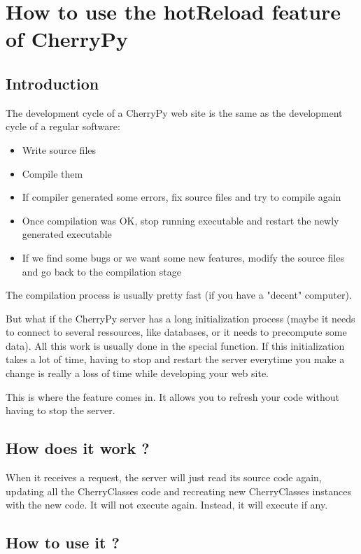 \documentclass{manual}
\begin{document}
\chapter{How to use the hotReload feature of CherryPy}
\section{Introduction}
The development cycle of a CherryPy web site is the same as the development cycle of a regular software:
\begin{itemize}
\item
Write source files
\item
Compile them
\item
If compiler generated some errors, fix source files and try to compile again
\item
Once compilation was OK, stop running executable and restart the newly generated executable
\item
If we find some bugs or we want some new features, modify the source files and go back to the compilation stage
\end{itemize}

The compilation process is usually pretty fast (if you have a "decent" computer).

But what if the CherryPy server has a long initialization process (maybe it needs to connect to several ressources,
like databases, or it needs to precompute some data). All this work is usually done in the  special
function. If this initialization takes a lot of time, having to stop and restart the server everytime you make
a change is really a loss of time while developing your web site.

This is where the  feature comes in. It allows you to refresh your code without having to stop
the server.


\section{How does it work ?}
When it receives a  request, the server will just read its source code again, updating all the CherryClasses
code and recreating new CherryClasses instances with the new code. It will not execute  again. Instead,
it will execute  if any.

\section{How to use it ?}
\end{document}
